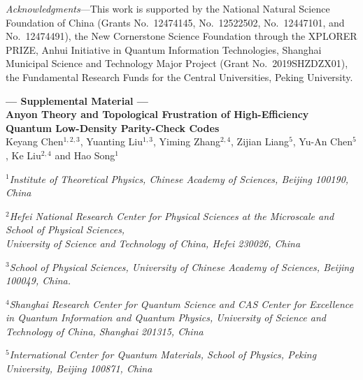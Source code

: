 \documentclass[aps,prl,english,superscriptaddress,twocolumn,tightenlines,showpacs,longbibliography,floatfix,amsfonts]{revtex4-2}
\begin{document}
	
	\begin{acknowledgments}
		\emph{Acknowledgments}---This work is supported by the National Natural Science Foundation of China (Grants No.~12474145, No.~12522502, No.~12447101, and No.~12474491), the New Cornerstone Science Foundation through the XPLORER PRIZE, Anhui Initiative in Quantum Information Technologies, Shanghai Municipal Science and Technology Major Project (Grant No.~2019SHZDZX01), the Fundamental Research Funds for the Central Universities, Peking University.
	\end{acknowledgments}
	
	
	
	\onecolumngrid
\clearpage
\makeatletter
\begin{center}
	\textbf{\large --- Supplemental Material ---\\[0.5em]Anyon Theory and Topological Frustration of High-Efficiency 
		\\Quantum Low-Density Parity-Check Codes}\\[1em]
	
	Keyang Chen$^{1,2,3}$, Yuanting Liu$^{1,3}$, Yiming Zhang$^{2,4}$, Zijian Liang$^{5}$, Yu-An Chen$^{5}$, Ke Liu$^{2,4}$ and Hao Song$^{1}$
	
	\vspace{5pt}
	
	{\centering \emph{$^1$Institute of Theoretical Physics, Chinese Academy of Sciences, Beijing 100190, China}}
	
	{\centering \emph{$^2$Hefei National Research Center for Physical Sciences at the Microscale and School of Physical Sciences, \\ University of Science and Technology of China, Hefei 230026, China}}
	
	{\centering \emph{$^3$School of Physical Sciences, University of Chinese Academy of Sciences, Beijing 100049, China.}}
	
	{\centering \emph{$^4$Shanghai Research Center for Quantum Science and CAS Center for Excellence in Quantum Information and Quantum Physics, University of Science and Technology of China, Shanghai 201315, China}}
	
	{\centering \emph{$^5$International Center for Quantum Materials, School of Physics, Peking University, Beijing 100871, China}}
	
	
	\thispagestyle{titlepage}
\end{center}
\setcounter{equation}{0}
\setcounter{figure}{0}
\setcounter{table}{0}
\setcounter{page}{1}
\setcounter{section}{0}
\renewcommand{\theequation}{S\arabic{equation}}
\renewcommand{\thefigure}{S\arabic{figure}}
\renewcommand{\thetable}{S\arabic{table}}
\renewcommand{\thesection}{S.\Roman{section}}
\end{document}
